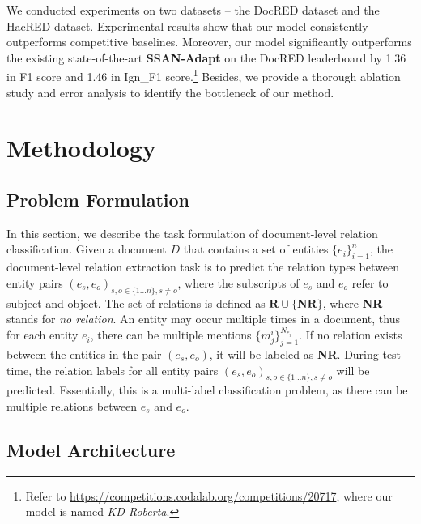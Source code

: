 \documentclass[11pt]{article}
\begin{document}
We conducted experiments on two datasets -- the DocRED \citep{yao2019docred} dataset and the HacRED \citep{cheng-etal-2021-hacred} dataset. Experimental results show that our model consistently outperforms competitive baselines. Moreover, our model significantly outperforms the existing state-of-the-art \textbf{SSAN-Adapt} \citep{xu2021entity} on the DocRED leaderboard by 1.36 in F1 score and 1.46 in Ign\_F1 score.\footnote{Refer to {\url{https://competitions.codalab.org/competitions/20717}}, where our model is named \textit{KD-Roberta}.} Besides, we provide a thorough ablation study and error analysis to identify the bottleneck of our method. 







\section{Methodology}
\subsection{Problem Formulation}
In this section, we describe the task formulation of document-level relation classification. Given a document $D$ that contains a set of entities $\{e_i\}_{i=1}^n$, the document-level relation extraction task is to predict the relation types between entity pairs $(e_s,e_o)_{s,o \in \{1...n\}, {s}\neq{o}}$, where the subscripts of $e_s$ and $e_o$ refer to subject and object. The set of relations is defined as $\textbf{R} \cup \{\textbf{NR}\}$, where \textbf{NR} stands for \textit{no relation}. An entity may occur multiple times in a document, thus for each entity $e_i$, there can be multiple mentions $\{m_j^{i}\}^{N_{e_i}}_{j=1}$. If no relation exists between the entities in the pair $(e_s,e_o)$, it will be labeled as \textbf{NR}. During test time, the relation labels for all entity pairs $(e_s,e_o)_{s,o \in \{1...n\}, {s}\neq{o}}$ will be predicted. Essentially, this is a multi-label classification problem, as there can be multiple relations between $e_s$ and $e_o$.








\subsection{Model Architecture}
\end{document}
